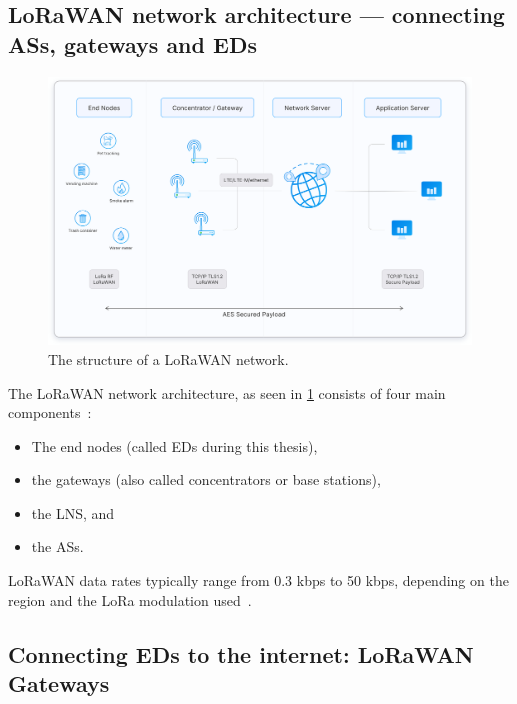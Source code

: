 \subsection{\acs{LoRaWAN} network architecture — connecting \aclp{AS}, gateways and \aclp{ED}}

\begin{figure}[htbp]
    \centering
    \includegraphics[width=1\textwidth]{pictures/lorawan-structure/lorawan-architecture.png}
    \caption{
        The structure of a \ac{LoRaWAN} network.~\protect\cite{the_things_industries_bv_lorawan_nodate}
    }\label{pic:lorawan-network-structure}
\end{figure}

The \ac{LoRaWAN} network architecture, as seen in \cref{pic:lorawan-network-structure} consists of four main components~\cite[p. 8]{lora_alliance_inc_lorawan_specification_2017}:

\begin{itemize}
    \item The end nodes (called \aclp{ED} during this thesis),
    \item the gateways (also called concentrators or base stations),
    \item the \acf{LNS}, and
    \item the \acfp{AS}.
\end{itemize}

\ac{LoRaWAN} data rates typically range from 0.3 kbps to 50 kbps, depending on the region and the \ac{LoRa} modulation used~\cite[p. 8]{lora_alliance_inc_lorawan_specification_2017}.

\subsection{Connecting \aclp{ED} to the internet: \acs{LoRaWAN} Gateways}\label{sec:gateways}

